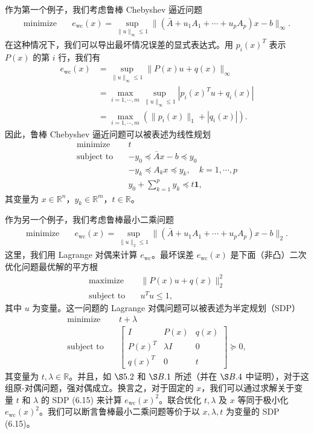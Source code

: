\documentclass[UTF8, 12pt, fontset=fandol, oneside]{ctexart}
\begin{document}
作为第一个例子，我们考虑鲁棒 Chebyshev 逼近问题
\[
\begin{aligned}
\text{minimize}\quad & e_{\mathrm{wc}}(x)=\sup_{\|u\|_\infty\leq 1}\|(\bar{A}+u_1A_1+\cdots+u_pA_p)x-b\|_\infty.
\end{aligned}
\]
在这种情况下，我们可以导出最坏情况误差的显式表达式。用 $p_i(x)^T$ 表示 $P(x)$ 的第 $i$ 行，我们有
\[
\begin{aligned}
e_{\mathrm{wc}}(x)
&=\sup_{\|u\|_\infty\leq 1}\|P(x)u+q(x)\|_\infty\\
&=\max_{i=1,\cdots,m}\sup_{\|u\|_\infty\leq 1}|p_i(x)^Tu+q_i(x)|\\
&=\max_{i=1,\cdots,m}(\|p_i(x)\|_1+|q_i(x)|).
\end{aligned}
\]
因此，鲁棒 Chebyshev 逼近问题可以被表述为线性规划
\[
\begin{aligned}
\text{minimize}\quad & t\\
\text{subject to}\quad & -y_0\preceq \bar{A}x-b\preceq y_0\\
& -y_k\preceq A_kx\preceq y_k,\quad k=1,\cdots,p\\
& y_0+\sum_{k=1}^p y_k\preceq t\mathbf{1},
\end{aligned}
\]
其变量为 $x\in\mathbb{R}^n$，$y_k\in\mathbb{R}^m$，$t\in\mathbb{R}$。

作为另一个例子，我们考虑鲁棒最小二乘问题
\[
\begin{aligned}
\text{minimize}\quad & e_{\mathrm{wc}}(x)=\sup_{\|u\|_2\leq 1}\|(\bar{A}+u_1A_1+\cdots+u_pA_p)x-b\|_2.
\end{aligned}
\]
这里，我们用 Lagrange 对偶来计算 $e_{\mathrm{wc}}$。最坏误差 $e_{\mathrm{wc}}(x)$ 是下面（非凸）二次优化问题最优解的平方根
\[
\begin{aligned}
\text{maximize}\quad & \|P(x)u+q(x)\|_2^2\\
\text{subject to}\quad & u^Tu\leq 1,
\end{aligned}
\]
其中 $u$ 为变量。这一问题的 Lagrange 对偶问题可以被表述为半定规划（SDP）
\begin{equation}
\begin{aligned}
\text{minimize}\quad & t+\lambda\\
\text{subject to}\quad &
\begin{bmatrix}
I & P(x) & q(x)\\
P(x)^T & \lambda I & 0\\
q(x)^T & 0 & t
\end{bmatrix}\succeq 0,
\end{aligned}
\tag{6.15}
\end{equation}
其变量为 $t,\lambda\in\mathbb{R}$。并且，如 $\S 5.2$ 和 $\S B.1$ 所述（并在 $\S B.4$ 中证明），对于这组原-对偶问题，强对偶成立。换言之，对于固定的 $x$，我们可以通过求解关于变量 $t$ 和 $\lambda$ 的 SDP (6.15) 来计算 $e_{\mathrm{wc}}(x)^2$。联合优化 $t,\lambda$ 及 $x$ 等同于极小化 $e_{\mathrm{wc}}(x)^2$。我们可以断言鲁棒最小二乘问题等价于以 $x,\lambda,t$ 为变量的 SDP (6.15)。
\end{document}
